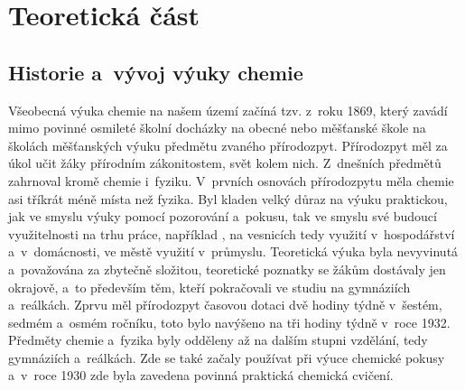 \chapter{Teoretická část}

\section{Historie a~vývoj výuky chemie}

Všeobecná výuka chemie na našem území začíná tzv.  z~roku 1869, který zavádí mimo povinné osmileté školní docházky na obecné nebo měšťanské škole na školách měšťanských výuku předmětu zvaného přírodozpyt. Přírodozpyt měl za úkol učit žáky přírodním zákonitostem,  svět kolem nich. Z~dnešních předmětů zahrnoval kromě chemie i~fyziku. V~prvních osnovách přírodozpytu měla chemie asi tříkrát méně místa než fyzika. Byl kladen velký důraz na výuku praktickou, jak ve smyslu výuky pomocí pozorování a~pokusu, tak ve smyslu své budoucí využitelnosti na trhu práce, například , na vesnicích tedy využití v~hospodářství a~v~domácnosti, ve městě využití v~průmyslu. Teoretická výuka byla nevyvinutá a~považována za zbytečně složitou, teoretické poznatky se žákům dostávaly jen okrajově, a~to především těm, kteří pokračovali ve studiu na gymnáziích a~reálkách. Zprvu měl přírodozpyt časovou dotaci dvě hodiny týdně v~šestém, sedmém a~osmém ročníku, toto bylo navýšeno na tři hodiny týdně v~roce 1932. \cite{prirodozpyt} Předměty chemie a~fyzika byly odděleny až na dalším stupni vzdělání, tedy gymnáziích a~reálkách. Zde se také začaly používat při výuce chemické pokusy a~v~roce 1930 zde byla zavedena povinná praktická chemická cvičení. \cite{historie_vyuky}

